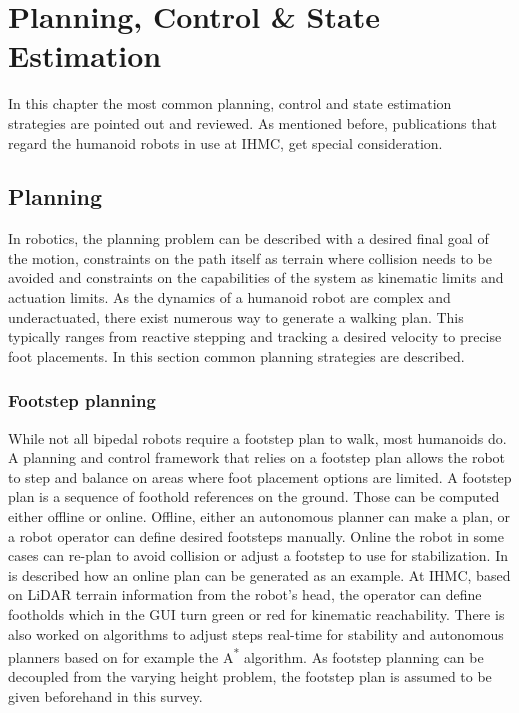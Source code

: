 %
\chapter{Planning, Control \& State Estimation}%
\label{chap:planningcontrol}
In this chapter the most common planning, control and state estimation strategies are pointed out and reviewed. As mentioned before, publications that regard the humanoid robots in use at IHMC, get special consideration.

\section{Planning}
In robotics, the planning problem can be described with a desired final goal of the motion, constraints on the path itself as terrain where collision needs to be avoided and constraints on the capabilities of the system as kinematic limits and actuation limits. As the dynamics of a humanoid robot are complex and underactuated, there exist numerous way to generate a walking plan. This typically ranges from reactive stepping and tracking a desired velocity to precise foot placements. In this section common planning strategies are described.

\subsection{Footstep planning}
While not all bipedal robots require a footstep plan to walk, most humanoids do. A planning and control framework that relies on a footstep plan allows the robot to step and balance on areas where foot placement options are limited.  A footstep plan is a sequence of foothold references on the ground. Those can be computed either offline or online. Offline, either an autonomous planner can make a plan, or a robot operator can define desired footsteps manually. Online the robot in some cases can re-plan to avoid collision or adjust a footstep to use for stabilization. In \cite{chestnutt2005footstep} is described how an online plan can be generated as an example. At IHMC, based on LiDAR terrain information from the robot's head, the operator can define footholds which in the \ac{GUI} turn green or red for kinematic reachability. There is also worked on algorithms to adjust steps real-time for stability \cite{griffin2017walking} and autonomous planners based on for example the A\textsuperscript{*} algorithm. As footstep planning can be decoupled from the varying height problem, the footstep plan is assumed to be given beforehand in this survey.

